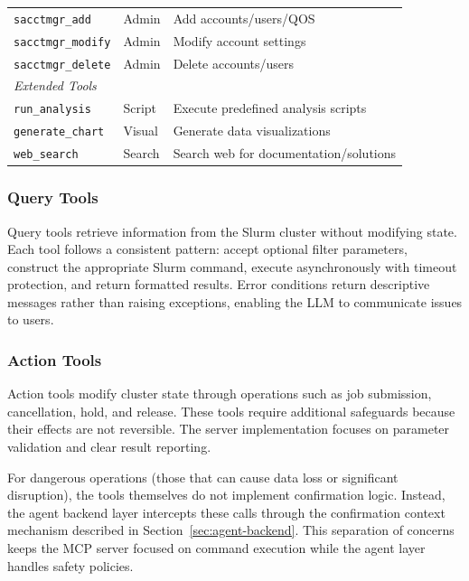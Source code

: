 \begin{table}[H]
\begin{tabular}{|l|l|l|}
        \texttt{sacctmgr\_add} & Admin & Add accounts/users/QOS \\
        \texttt{sacctmgr\_modify} & Admin & Modify account settings \\
        \texttt{sacctmgr\_delete} & Admin & Delete accounts/users \\
        \hline
        \multicolumn{3}{|l|}{\textit{Extended Tools}} \\
        \hline
        \texttt{run\_analysis} & Script & Execute predefined analysis scripts \\
        \texttt{generate\_chart} & Visual & Generate data visualizations \\
        \texttt{web\_search} & Search & Search web for documentation/solutions \\
        \hline
    \end{tabular}
\end{table}

\subsubsection{Query Tools}

Query tools retrieve information from the Slurm cluster without modifying state. Each tool follows a consistent pattern: accept optional filter parameters, construct the appropriate Slurm command, execute asynchronously with timeout protection, and return formatted results. Error conditions return descriptive messages rather than raising exceptions, enabling the LLM to communicate issues to users.

\subsubsection{Action Tools}

Action tools modify cluster state through operations such as job submission, cancellation, hold, and release. These tools require additional safeguards because their effects are not reversible. The server implementation focuses on parameter validation and clear result reporting.

For dangerous operations (those that can cause data loss or significant disruption), the tools themselves do not implement confirmation logic. Instead, the agent backend layer intercepts these calls through the confirmation context mechanism described in Section~\ref{sec:agent-backend}. This separation of concerns keeps the MCP server focused on command execution while the agent layer handles safety policies.

